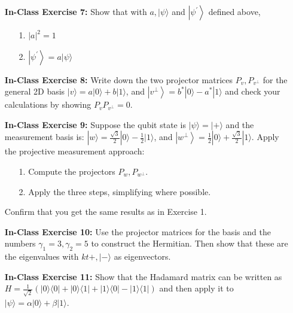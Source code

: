 \documentclass[main.tex]{subfiles}
\begin{document}
\begin{enumerate}
\item[] \textbf{In-Class Exercise 7:} Show that with $a,|\psi\rangle$ and $\left|\psi^{\prime}\right\rangle$ defined above,

    \begin{enumerate}
        \item[1.] $|a|^{2}=1$
        \item[2.] $\left|\psi^{\prime}\right\rangle=a|\psi\rangle$
        \end{enumerate}

\item[] \textbf{In-Class Exercise 8:} Write down the two projector matrices $P_{v}, P_{v^{\perp}}$ for the general 2D basis $|v\rangle=a|0\rangle+b|1\rangle$, and $\left|v^{\perp}\right\rangle=b^{*}|0\rangle-a^{*}|1\rangle$ and check your calculations by showing $P_{v} P_{v^{\perp}}=0$.

\item[] \textbf{In-Class Exercise 9:} Suppose the qubit state is $|\psi\rangle=|+\rangle$ and the measurement basis is: $|w\rangle=\frac{\sqrt{3}}{2}|0\rangle-\frac{1}{2}|1\rangle$, and $\left|w^{\perp}\right\rangle=\frac{1}{2}|0\rangle+\frac{\sqrt{3}}{2}|1\rangle$. Apply the projective measurement approach:

    \begin{enumerate}
        \item[1.] Compute the projectors $P_{w}, P_{w^{\perp}}$.
        \item[2.] Apply the three steps, simplifying where possible.
    \end{enumerate}
    
    Confirm that you get the same results as in Exercise 1.

\item[] \textbf{In-Class Exercise 10:} Use the projector matrices for the basis and the numbers $\gamma_{1}=3, \gamma_{2}=5$ to construct the Hermitian. Then show that these are the eigenvalues with $k t+,|-\rangle$ as eigenvectors.

\item[] \textbf{In-Class Exercise 11:} Show that the Hadamard matrix can be written as $H=\frac{1}{\sqrt{2}}(|0\rangle\langle 0|+| 0\rangle\langle 1|+| 1\rangle\langle 0|-| 1\rangle\langle 1|)$ and then apply it to $|\psi\rangle=\alpha|0\rangle+\beta|1\rangle$.

\end{enumerate}
\end{document}
